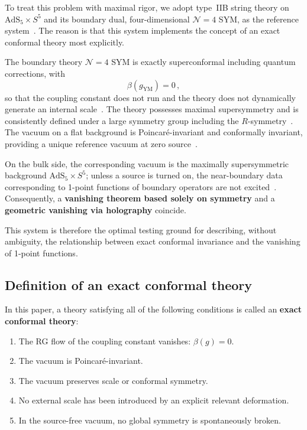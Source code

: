 \documentclass[
  aps,
  prd,
  preprint,
  groupedaddress,
  nofootinbib,
  longbibliography
]{revtex4-2}
\theoremstyle{remark}
\newcommand{\N}{\mathcal{N}}
\newcommand{\AdS}{\mathrm{AdS}}
\begin{document}
To treat this problem with maximal rigor, we adopt type~IIB
string theory on $\AdS_5\times S^5$ and its boundary dual,
four-dimensional $\N=4$ SYM, as the reference
system~\cite{ref1,ref2,ref3,ref4}.
The reason is that this system implements the concept of an
exact conformal theory most explicitly.

The boundary theory $\N=4$ SYM is exactly superconformal
including quantum corrections, with
\begin{equation}\label{eq:beta-zero}
  \beta(g_{\mathrm{YM}}) = 0\,,
\end{equation}
so that the coupling constant does not run and the theory
does not dynamically generate an internal
scale~\cite{ref4,ref6,ref7}.
The theory possesses maximal supersymmetry and is consistently
defined under a large symmetry group including the
$R$-symmetry~\cite{ref4,ref6,ref7}.
The vacuum on a flat background is Poincar\'e-invariant and
conformally invariant, providing a unique reference vacuum
at zero source~\cite{ref4,ref6,ref13,ref14}.

On the bulk side, the corresponding vacuum is the maximally
supersymmetric background $\AdS_5\times S^5$; unless a source
is turned on, the near-boundary data corresponding to 1-point
functions of boundary operators are not
excited~\cite{ref2,ref3,ref9,ref10,ref11,ref12}.
Consequently, a \textbf{vanishing theorem based solely on
symmetry} and a \textbf{geometric vanishing via holography}
coincide.

This system is therefore the optimal testing ground for
describing, without ambiguity, the relationship between
exact conformal invariance and the vanishing of 1-point
functions.

\subsection{Definition of an exact conformal theory}\label{subsec:1-3}

In this paper, a theory satisfying all of the following
conditions is called an \textbf{exact conformal theory}:

\begin{enumerate}
\item The RG flow of the coupling constant vanishes:
  $\beta(g)=0$.
\item The vacuum is Poincar\'e-invariant.
\item The vacuum preserves scale or conformal symmetry.
\item No external scale has been introduced by an explicit
  relevant deformation.
\item In the source-free vacuum, no global symmetry is
  spontaneously broken.
\end{enumerate}
\end{document}
